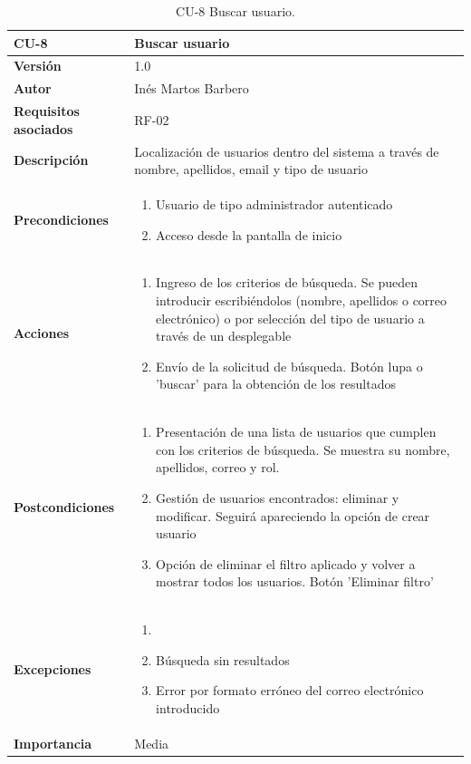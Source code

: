 \begin{table}[p]
	\centering
	\begin{tabularx}{\linewidth}{ p{} p{} }
		\toprule
		\textbf{CU-8}    & \textbf{Buscar usuario}\\
		\toprule
		\textbf{Versión}              & 1.0    \\
		\textbf{Autor}                & Inés Martos Barbero \\
		\textbf{Requisitos asociados} & RF-02 \\
		\textbf{Descripción}          & Localización de usuarios dentro del sistema a través de nombre, apellidos, email y tipo de usuario \\
		\textbf{Precondiciones}         & 
            \begin{enumerate}
			\def\labelenumi{\arabic{enumi}.}
			\tightlist
			\item Usuario de tipo administrador autenticado
			\item Acceso desde la pantalla de inicio
		\end{enumerate}\\
		\textbf{Acciones}             &
		\begin{enumerate}
			\def\labelenumi{\arabic{enumi}.}
			\tightlist
			\item Ingreso de los criterios de búsqueda. Se pueden introducir escribiéndolos (nombre, apellidos o correo electrónico) o por selección del tipo de usuario a través de un desplegable
			\item Envío de la solicitud de búsqueda. Botón lupa o 'buscar' para la obtención de los resultados
		\end{enumerate}\\
		\textbf{Postcondiciones}        & 
            \begin{enumerate}
			\def\labelenumi{\arabic{enumi}.}
			\tightlist
			\item Presentación de una lista de usuarios que cumplen con los criterios de búsqueda. Se muestra su nombre, apellidos, correo y rol.
			\item Gestión de usuarios encontrados: eliminar y modificar. Seguirá apareciendo la opción de crear usuario
                \item Opción de eliminar el filtro aplicado y volver a mostrar todos los usuarios. Botón 'Eliminar filtro'
		\end{enumerate}\\
		\textbf{Excepciones}          & 
            \begin{enumerate}
			\def\labelenumi{\arabic{enumi}.}
			\tightlist
			\item 
			\item Búsqueda sin resultados
                \item Error por formato erróneo del correo electrónico introducido
		\end{enumerate}\\
		\textbf{Importancia}          & Media \\
		\bottomrule
	\end{tabularx}
	\caption{CU-8 Buscar usuario.}
\end{table}

